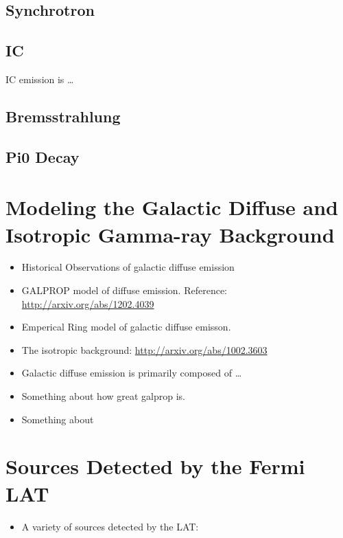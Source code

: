\subsection{Synchrotron}

\subsection{\acl{IC}}

\ac{IC} emission is \ldots

\subsection{Bremsstrahlung}

\subsection{Pi0 Decay}

\section{Modeling the Galactic Diffuse and Isotropic Gamma-ray Background}

\begin{itemize}
  \item Historical Observations of galactic diffuse emission
  \item GALPROP model of diffuse emission.
  Reference: \url{http://arxiv.org/abs/1202.4039}
  \item Emperical Ring model of galactic diffuse emisson.
  \item The isotropic background: \url{http://arxiv.org/abs/1002.3603}
\end{itemize}

\begin{itemize}
  \item Galactic diffuse emission is primarily composed of \ldots
  \item Something about how great galprop is.
  \item Something about
\end{itemize}

\section{Sources Detected by the Fermi \acs{LAT}}

\begin{itemize}
  \item A variety of sources detected by the \acs{LAT}:
\end{itemize}


